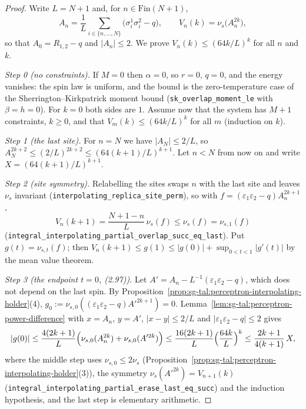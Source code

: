 \begin{proof}
  \leanok
Write $L=N+1$ and, for $n\in\mathrm{Fin}(N+1)$,
\[
 A_n=\frac1L\sum_{i\in\{n,\dots,N\}}\bigl(\sigma_i^1\sigma_i^2-q\bigr),\qquad V_n(k)=\nu_s\bigl(A_n^{2k}\bigr),
\]
so that $A_0=R_{1,2}-q$ and $|A_n|\le 2$. We prove $V_n(k)\le(64k/L)^k$ for all $n$ and $k$.

\emph{Step 0 (no constraints).} If $M=0$ then $\alpha=0$, so $r=0$, $q=0$, and the energy vanishes: the spin law
is uniform, and the bound is the zero-temperature case of the Sherrington--Kirkpatrick moment bound
(\texttt{sk\_overlap\_moment\_le} with $\beta=h=0$). For $k=0$ both sides are $1$. Assume now that the system has
$M+1$ constraints, $k\ge0$, and that $V_m(k)\le(64k/L)^k$ for all $m$ (induction on $k$).

\emph{Step 1 (the last site).} For $n=N$ we have $|A_N|\le 2/L$, so $A_N^{2k+2}\le(2/L)^{2k+2}\le(64(k+1)/L)^{k+1}$.
Let $n<N$ from now on and write $X=(64(k+1)/L)^{k+1}$.

\emph{Step 2 (site symmetry).} Relabelling the sites swaps $n$ with the last site and leaves $\nu_s$
invariant (\texttt{interpolating\_replica\_site\_perm}), so with $f=(\varepsilon_1\varepsilon_2-q)A_n^{2k+1}$,
\[
 V_n(k+1)=\frac{N+1-n}{L}\,\nu_s(f)\le\nu_s(f)=\nu_{s,1}(f)
\]
(\texttt{integral\_interpolating\_partial\_overlap\_succ\_eq\_last}). Put $g(t)=\nu_{s,t}(f)$; then
$V_n(k+1)\le g(1)\le|g(0)|+\sup_{0<t<1}|g'(t)|$ by the mean value theorem.

\emph{Step 3 (the endpoint $t=0$, (2.97)).} Let $A'=A_n-L^{-1}(\varepsilon_1\varepsilon_2-q)$, which does not
depend on the last spin. By Proposition~\ref{prop:sg-tal:perceptron-interpolating-holder}(4),
$g_0:=\nu_{s,0}((\varepsilon_1\varepsilon_2-q)A'^{2k+1})=0$. Lemma~\ref{lem:sg-tal:perceptron-power-difference}
with $x=A_n$, $y=A'$, $|x-y|\le 2/L$ and $|\varepsilon_1\varepsilon_2-q|\le 2$ gives
\[
 |g(0)|\le\frac{4(2k+1)}{L}\Bigl(\nu_{s,0}(A_n^{2k})+\nu_{s,0}(A'^{2k})\Bigr)
 \le\frac{16(2k+1)}{L}\Bigl(\frac{64k}{L}\Bigr)^{k}\le\frac{2k+1}{4(k+1)}\,X,
\]
where the middle step uses $\nu_{s,0}\le 2\nu_s$ (Proposition~\ref{prop:sg-tal:perceptron-interpolating-holder}(3)),
the symmetry $\nu_s(A'^{2k})=V_{n+1}(k)$ (\texttt{integral\_interpolating\_partial\_erase\_last\_eq\_succ}) and the
induction hypothesis, and the last step is elementary arithmetic.


\end{proof}
